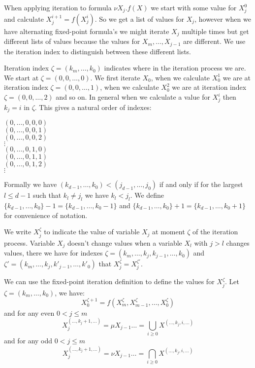 \documentclass[]{article}
\begin{document}
	When applying iteration to formula $\nu X_j.f(X)$ we start with some value for $X_j^0$ and calculate $X_j^{i+1} = f(X_j^{i})$. So we get a list of values for $X_j$, however when we have alternating fixed-point formula's we might iterate $X_j$ multiple times but get different lists of values because the values for $X_m,\dots,X_{j-1}$ are different. We use the iteration index to distinguish between these different lists. 
	
	Iteration index $\zeta = (k_m,\dots,k_0)$ indicates where in the iteration process we are. We start at $\zeta = (0,0,\dots,0)$. We first iterate $X_0$, when we calculate $X_0^1$ we are at iteration index $\zeta=(0,0,\dots,1)$, when we calculate $X_0^2$ we are at iteration index $\zeta=(0,0,\dots,2)$ and so on. In general when we calculate a value for $X_j^i$ then $k_j = i$ in $\zeta$. This gives a natural order of indexes:
	\begin{center}
		$(0,\dots,0,0,0)$\\
		$(0,\dots,0,0,1)$\\
		$(0,\dots,0,0,2)$\\
		$\vdots$\\
		$(0,\dots,0,1,0)$\\
		$(0,\dots,0,1,1)$\\
		$(0,\dots,0,1,2)$\\
		$\vdots$
	\end{center}
	Formally we have $(k_{d-1},\dots,k_0) < (j_{d-1},\dots,j_0)$ if and only if for the largest $l \leq d-1$ such that $k_l \neq j_l$ we have $k_l < j_l$. We define $\{k_{d-1},\dots,k_0\} -1 = \{k_{d-1},\dots,k_0-1\}$ and $\{k_{d-1},\dots,k_0\} +1 = \{k_{d-1},\dots,k_0+1\}$ for convenience of notation.
	
	We write $X_j^\zeta$ to indicate the value of variable $X_j$ at moment $\zeta$ of the iteration process. Variable $X_j$ doesn't change values when a variable $X_l$ with $j>l$ changes values, there we have for indexes $\zeta = (k_m,\dots,k_j,k_{j-1},\dots,k_0)$ and $\zeta' = (k_m,\dots,k_j,k'_{j-1},\dots,k'_0)$ that $X_j^\zeta = X_j^{\zeta'}$.
	
	We can use the fixed-point iteration definition to define the values for $X_j^\zeta$. Let  $\zeta= (k_m,\dots,k_0)$, we have:
	\[ X_0^{\zeta+1} = f(X_m^\zeta, X_{m-1}^\zeta,\dots,X_0^\zeta) \]
	and for any even $0 < j \leq m$
	\[ X_j^{(\dots,k_j+1,\dots)} = \mu X_{j-1}\dots = \bigcup_{i \geq 0}X^{(\dots,k_j,i,\dots)} \]
	and for any odd $0 < j \leq m$
	\[ X_j^{(\dots,k_j+1,\dots)} = \nu X_{j-1}\dots = \bigcap_{i \geq 0}X^{(\dots,k_j,i,\dots)} \]
	
\end{document}
